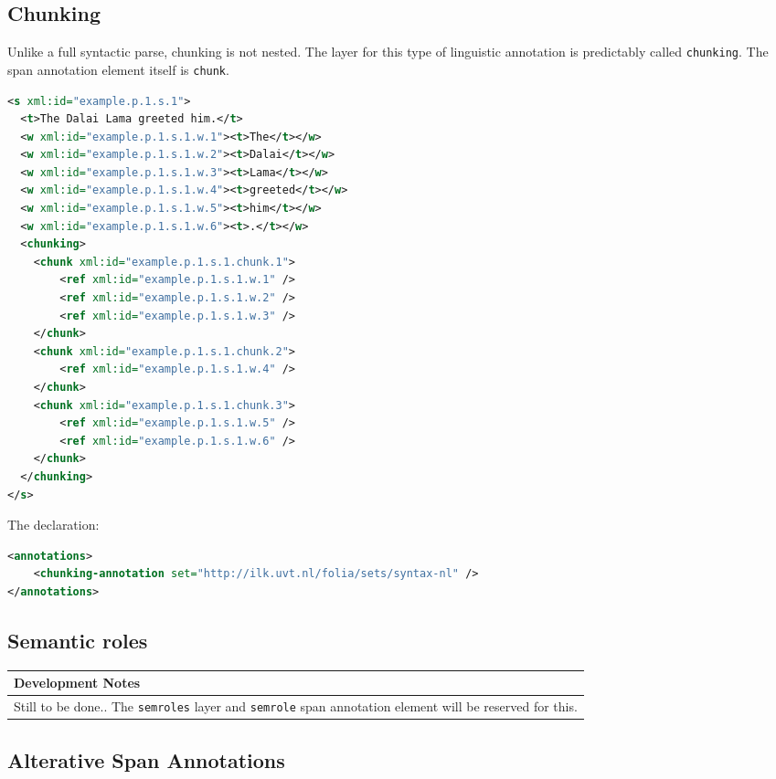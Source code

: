\documentclass[a4paper,12pt]{report}
\newenvironment{devnotes}
{
\begin{center}
    \begin{tabular}[h!]{|p{0.8\textwidth}|}
    \hline
    {\bf Development Notes}\\\hline}
{   \\\hline
    \end{tabular}
\end{center}}
\begin{document}
\subsection{Chunking}

Unlike a full syntactic parse, chunking is not nested. The layer for this type of linguistic annotation is predictably called \texttt{chunking}. The span annotation element itself is \texttt{chunk}.

\begin{lstlisting}[language=xml]
<s xml:id="example.p.1.s.1">
  <t>The Dalai Lama greeted him.</t>
  <w xml:id="example.p.1.s.1.w.1"><t>The</t></w>
  <w xml:id="example.p.1.s.1.w.2"><t>Dalai</t></w>
  <w xml:id="example.p.1.s.1.w.3"><t>Lama</t></w>
  <w xml:id="example.p.1.s.1.w.4"><t>greeted</t></w>
  <w xml:id="example.p.1.s.1.w.5"><t>him</t></w>
  <w xml:id="example.p.1.s.1.w.6"><t>.</t></w>
  <chunking>
    <chunk xml:id="example.p.1.s.1.chunk.1">       
        <ref xml:id="example.p.1.s.1.w.1" />       
        <ref xml:id="example.p.1.s.1.w.2" />       
        <ref xml:id="example.p.1.s.1.w.3" />        
    </chunk>
    <chunk xml:id="example.p.1.s.1.chunk.2">       
        <ref xml:id="example.p.1.s.1.w.4" />
    </chunk>
    <chunk xml:id="example.p.1.s.1.chunk.3">       
        <ref xml:id="example.p.1.s.1.w.5" />
        <ref xml:id="example.p.1.s.1.w.6" />
    </chunk>    
  </chunking>
</s>
\end{lstlisting}


The declaration:

\begin{lstlisting}[language=xml]
<annotations>
    <chunking-annotation set="http://ilk.uvt.nl/folia/sets/syntax-nl" />
</annotations>
\end{lstlisting}



\subsection{Semantic roles}

\begin{devnotes}
Still to be done.. The \texttt{semroles} layer and \texttt{semrole} span annotation element will be reserved for this.
\end{devnotes}

\subsection{Alterative Span Annotations}
\end{document}

